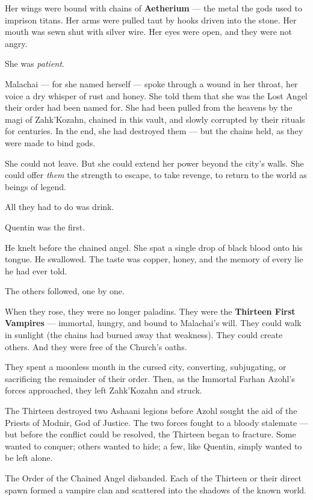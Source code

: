\documentclass[10pt,twoside]{book}
\begin{document}
Her wings were bound with chains of \textbf{Aetherium} --- the metal the gods used to imprison titans. Her arms were pulled taut by hooks driven into the stone. Her mouth was sewn shut with silver wire. Her eyes were open, and they were not angry.

She was \textit{patient}.

Malachai --- for she named herself --- spoke through a wound in her throat, her voice a dry whisper of rust and honey. She told them that she was the Lost Angel their order had been named for. She had been pulled from the heavens by the magi of Zahk'Kozahn, chained in this vault, and slowly corrupted by their rituals for centuries. In the end, she had destroyed them --- but the chains held, as they were made to bind gods.

She could not leave. But she could extend her power beyond the city's walls. She could offer \textit{them} the strength to escape, to take revenge, to return to the world as beings of legend.

All they had to do was drink.

Quentin was the first.

He knelt before the chained angel. She spat a single drop of black blood onto his tongue. He swallowed. The taste was copper, honey, and the memory of every lie he had ever told.

The others followed, one by one.

When they rose, they were no longer paladins. They were the \textbf{Thirteen First Vampires} --- immortal, hungry, and bound to Malachai's will. They could walk in sunlight (the chains had burned away that weakness). They could create others. And they were free of the Church's oaths.

They spent a moonless month in the cursed city, converting, subjugating, or sacrificing the remainder of their order. Then, as the Immortal Farhan Azohl's forces approached, they left Zahk'Kozahn and struck.

The Thirteen destroyed two Ashaani legions before Azohl sought the aid of the Priests of Modnir, God of Justice. The two forces fought to a bloody stalemate --- but before the conflict could be resolved, the Thirteen began to fracture. Some wanted to conquer; others wanted to hide; a few, like Quentin, simply wanted to be left alone.

The Order of the Chained Angel disbanded. Each of the Thirteen or their direct spawn formed a vampire clan and scattered into the shadows of the known world.
\end{document}
